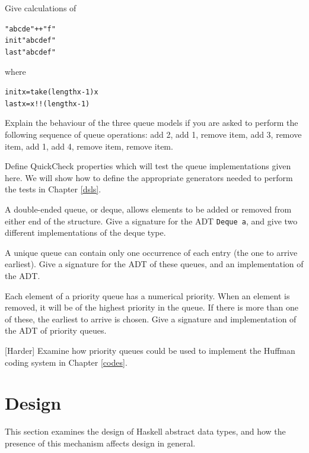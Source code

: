 \begin{exercises}

\item
Give calculations of
\begin{alltt}
"abcde" ++ "f"
init "abcdef"
last "abcdef"
\end{alltt}
where
\begin{alltt}
init x = take (length x-1) x
last x = x !! (length x-1)
\end{alltt}

\item
Explain the behaviour of the three queue models if you are asked to
perform the following sequence of queue operations: 
add 2,
add 1,
remove item,
add 3,
remove item,
add 1,
add 4,
remove item,
remove item.


\item
Define QuickCheck properties which will test the queue implementations given here. We will show how to define the appropriate generators needed to perform the tests in Chapter \ref{dsls}.


\item
A double-ended queue, or deque, allows elements to be added or removed from
either end of the structure. Give a signature for the ADT \texttt{Deque a},
and give two different implementations of the deque type.

\item
A unique queue can contain only one occurrence of each entry (the one to
arrive earliest). Give a signature for the ADT of these queues, and an
implementation of the ADT.

\item
Each element of a priority queue has a numerical priority. When an element is
removed, it will be of the highest priority in the queue. If there is more
than one of these, the earliest to arrive is chosen. Give a signature and
implementation of the ADT of priority queues. 

\item
{[Harder]}
Examine how priority queues could be used to implement the Huffman coding
system in Chapter \ref{codes}.
\end{exercises}

\section{Design}
\label{adtDesign}

This section examines the design of Haskell abstract data types, and how the
presence of this mechanism affects design in general.

